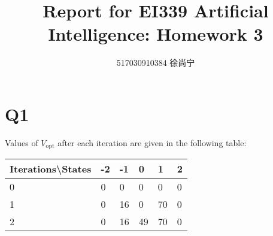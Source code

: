 \documentclass[a4paper]{article}
\title{Report for EI339 Artificial Intelligence: Homework 3}
\author{517030910384 徐尚宁}
\date{}
\begin{document}
\begin{CJK}{UTF8}{gbsn}
    \maketitle
\end{CJK}

\section*{Q1}

Values of $V_\textrm{opt}$ after each iteration are given in the following table:

\begin{table}[h]
    \begin{tabular}{|l|l|l|l|l|l|}
    \hline
    Iterations\textbackslash States & -2 & -1 & 0 & 1 & 2 \\ \hline
    0 & 0 & 0 & 0 & 0 & 0 \\ \hline
    1 & 0 & 16 & 0 & 70 & 0 \\ \hline
    2 & 0 & 16 & 49 & 70 & 0 \\ \hline
    \end{tabular}
\end{table}
\end{document}
